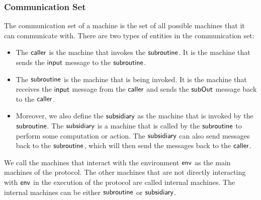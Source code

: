 \subsubsection{Communication Set}
The communication set of a machine is the set of all possible machines that it can communicate with. There are two types of entities in the communication set:
\begin{itemize}
    \item The $\mathsf{caller}$ is the machine that invokes the $\mathsf{subroutine}$. It is the machine that sends the $\mathsf{input}$ message to the $\mathsf{subroutine}$.
    \item The $\mathsf{subroutine}$ is the machine that is being invoked. It is the machine that receives the $\mathsf{input}$ message from the $\mathsf{caller}$ and sends the $\mathsf{subOut}$ message back to the $\mathsf{caller}$.
    \item Moreover, we also define the $\mathsf{subsidiary}$ as the machine that is invoked by the $\mathsf{subroutine}$. The $\mathsf{subsidiary}$ is a machine that is called by the $\mathsf{subroutine}$ to perform some computation or action. The $\mathsf{subsidiary}$ can also send messages back to the $\mathsf{subroutine}$, which will then send the messages back to the $\mathsf{caller}$.
\end{itemize}

We call the machines that interact with the environment $\mathsf{env}$ as the main machines of the protocol. The other machines that are not directly interacting with $\mathsf{env}$ in the execution of the protocol are called internal machines. The internal machines can be either $\mathsf{subroutine}$ or $\mathsf{subsidiary}$.


